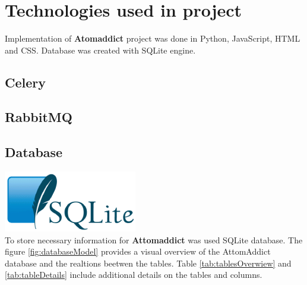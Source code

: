 \documentclass[12pt]{article}
\begin{document}
\vspace{0.5cm}

\section{Technologies used in project}
Implementation of \textbf{Atomaddict} project was done in Python, JavaScript, HTML and CSS. Database was created with SQLite engine.

\subsection{Celery}

\subsection{RabbitMQ}

\subsection{Database}

\includegraphics{images/sqlite.png} \\

To store necessary information for \textbf{Attomaddict} was used SQLite database. The figure \ref{fig:databaseModel} provides a visual overview of the AttomAddict database and the realtions beetwen the tables. Table \ref{tab:tablesOverwiew} and \ref{tab:tableDetails} include additional details on the tables and columns.
\end{document}
